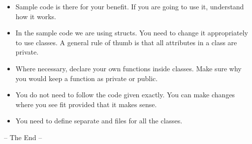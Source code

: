 \documentclass[a4paper,12pt]{article}
\begin{document}
	\begin{itemize}
		\item Sample code is there for your benefit. If you are going to use it, understand how it works.
		\item In the sample code we are using structs. You need to change it appropriately to use classes. A general rule of thumb is that all attributes in a class are private.
		\item Where necessary, declare your own functions inside classes. Make sure why you would keep a function as private or public.
		\item You do not need to follow the code given exactly. You can make changes where you see fit provided that it makes sense.
		\item You need to define separate  and  files for all the classes.
	\end{itemize}

	\begin{center}
		-- The End --
	\end{center}
	\newpage
	
	
\end{document}

